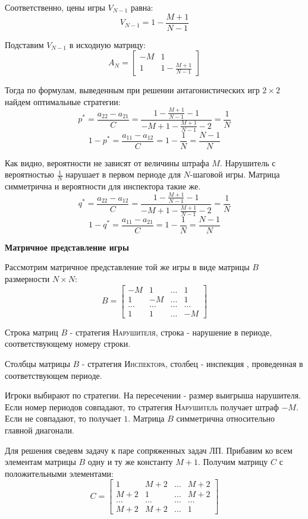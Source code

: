 \documentclass[aps,%
12pt,%
final,%
oneside,
onecolumn,%
musixtex, %
superscriptaddress,%
centertags]{article} %
\theoremstyle{plain}
\theoremstyle{definition}
\theoremstyle{remark}
\begin{document}
Соответственно, цены игры $V_{N-1}$ равна:
$$V_{N-1} = 1 - \frac{M+1}{N-1}$$

Подставим $V_{N-1}$ в исходную матрицу:
$$A_N = \begin{bmatrix}
  -M & 1 \\ 1 & 1 - \frac{M+1}{N-1}
\end{bmatrix}$$

Тогда по формулам, выведенным при решении антагонистических игр $2\times 2$ найдем оптимальные стратегии:
$$p^{*} = \frac {a_{22}-a_{21}}{C}  = \frac{1 - \frac{M+1}{N-1}-1}{-M+1 - \frac{M+1}{N-1}-2} = \frac{1}{N}$$
$$1-p^{*} = \frac{a_{11} - a_{12}}{C}  = 1 - \frac{1}{N} = \frac{N-1}{N}$$

Как видно, вероятности не зависят от величины штрафа $M$. Нарушитель с вероятностью $\frac{1}{N}$ нарушает в первом периоде для $N$-шаговой игры. Матрица симметрична и вероятности для инспектора такие же.
$$q^{*} = \frac {a_{22}-a_{12}}{C} = \frac{1 - \frac{M+1}{N-1}-1}{-M+1 - \frac{M+1}{N-1}-2} = \frac{1}{N}$$
$$1-q^{*} = \frac{a_{11} - a_{21}}{C}  = 1 - \frac{1}{N} = \frac{N-1}{N}$$

\textbf{Матричное представление игры}

Рассмотрим матричное представление той же игры в виде матрицы $B$ размерности $N \times N$:
$$B = \begin{bmatrix}
  -M & 1 & \ldots & 1 \\
  1 & -M & \ldots & 1 \\
  \ldots & \ldots & \ldots & \ldots \\
  1 & 1 & \ldots & -M
\end{bmatrix}$$

Строка матриц $B$ - стратегия \textsc{Нарушителя}, строка - нарушение в периоде, соответствующему номеру строки. 

Столбцы матрицы $B$ - стратегия \textsc{Инспектора}, столбец - инспекция , проведенная в соответствующем периоде.

Игроки выбирают по стратегии. На пересечении - размер выигрыша нарушителя. Если номер периодов совпадают, то стратегия \textsc{Нарушитель} получает штраф $-M$. Если не совпадают, то получает $1$. Матрица $B$ симметрична относительно главной диагонали.

Для решения сведевм задачу к паре сопряженных задач ЛП. Прибавим ко всем элементам матрицы $B$ одну и ту же константу $M+1$. Получим матрицу $C$ с положительными элементами:
$$C = \begin{bmatrix}
  1 & M+2 & \ldots & M+2 \\
  M+2 & 1 & \ldots & M+2 \\
  \ldots & \ldots & \ldots & \ldots \\
  M+2 & M+2 & \ldots & 1
\end{bmatrix}$$
\end{document}
